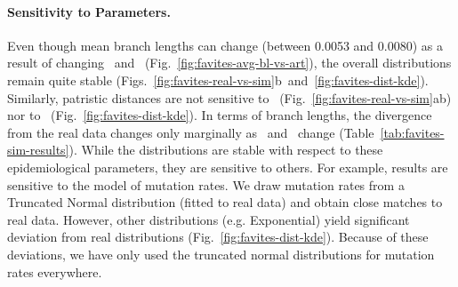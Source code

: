 \paragraph{Sensitivity to Parameters.} Even though mean branch lengths can change (between 0.0053 and 0.0080) as a result of changing \EART\ and \ED\ (Fig.~\ref{fig:favites-avg-bl-vs-art}), the overall distributions remain quite stable (Figs.~\ref{fig:favites-real-vs-sim}b~and~\ref{fig:favites-dist-kde}). Similarly, patristic distances are not sensitive to \EART\ (Fig.~\ref{fig:favites-real-vs-sim}ab) nor to \ED\ (Fig.~\ref{fig:favites-dist-kde}). In terms of branch lengths, the divergence from the real data changes only marginally as \ED\ and \EART\ change (Table~\ref{tab:favites-sim-results}). While the distributions are stable with respect to these epidemiological parameters, they are sensitive to others. For example, results are sensitive to the model of mutation rates. We draw mutation rates from a Truncated Normal distribution (fitted to real data) and obtain close matches to real data. However, other distributions (e.g. Exponential) yield significant deviation from real distributions (Fig.~\ref{fig:favites-dist-kde}). Because of these deviations, we have only used the truncated normal distributions for mutation rates everywhere. 

